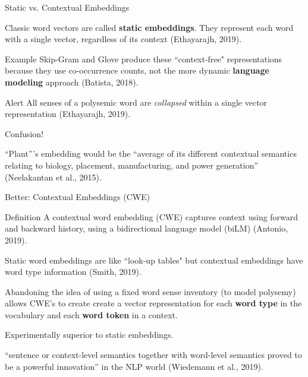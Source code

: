 \begin{frame}{Static vs. Contextual Embeddings}

\normalsize 

\begin{itemizeSpaced}{5pt}
    \pinkbox Classic word vectors are called \textbf{static embeddings}. They represent each word with a single vector, regardless of its context (Ethayarajh, 2019). 
    
    
    
    \begin{exampleBlock}{Example}
        Skip-Gram and Glove produce these ``context-free" representations because they use co-occurrence counts, not the more dynamic \textbf{language modeling} approach (Batista, 2018). 
    \end{exampleBlock}
    
    \begin{alertBlock}{Alert}
        All senses of a polysemic word are \emph{collapsed} within a single vector representation (Ethayarajh, 2019). 
        
        Confusion!
        
        ``Plant”'s embedding would be the ``average of its different contextual semantics relating to biology, placement, manufacturing, and power generation” (Neelakantan et al., 2015).

    
    \end{alertBlock}
      
\end{itemizeSpaced}
    
\end{frame}




\begin{frame}{Better: Contextual Embeddings (CWE)}

\begin{definitionBlock}{Definition}
    A \alert{contextual word embedding (CWE)} captures context using forward and backward history, using a bidirectional language model (biLM) (Antonio, 2019). 
    
    Static word embeddings are like ``look-up tables" but contextual embeddings have word type information (Smith, 2019). 
\end{definitionBlock}

\begin{itemizeSpaced}{7pt}

    \pinkbox Abandoning the idea of using a fixed word sense inventory (to model polysemy) allows CWE's to create create a vector representation for each \textbf{word type} in the vocabulary and each \textbf{word token} in a context. 
    
    \item Experimentally superior to static embeddings.
    
    \pinkbox ``sentence or context-level semantics together with word-level semantics proved to be a powerful innovation” in the NLP world (Wiedemann et al., 2019).
    
    
\end{itemizeSpaced}
    
\end{frame}
